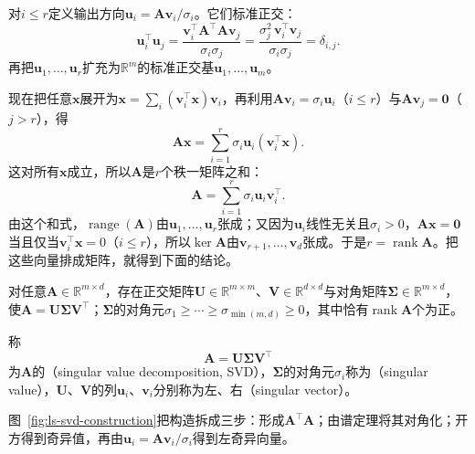 对$i\leq r$定义输出方向$\bm u_i=\bm A\bm v_i/\sigma_i$。它们标准正交：
\[
 \bm u_i^\top\bm u_j
 =\frac{\bm v_i^\top\bm A^\top\bm A\bm v_j}{\sigma_i\sigma_j}
 =\frac{\sigma_j^2\,\bm v_i^\top\bm v_j}{\sigma_i\sigma_j}=\delta_{i,j}.
\]
再把$\bm u_1,\dots,\bm u_r$扩充为$\mathbb R^m$的标准正交基$\bm u_1,\ldots,\bm u_m$。

现在把任意$\bm x$展开为$\bm x=\sum_i(\bm v_i^\top\bm x)\bm v_i$，再利用$\bm A\bm v_i=\sigma_i\bm u_i$（$i\leq r$）与$\bm A\bm v_j=\bm0$（$j>r$），得
\[
 \bm A\bm x=\sum_{i=1}^r\sigma_i\bm u_i(\bm v_i^\top\bm x).
\]
这对所有$\bm x$成立，所以$\bm A$是$r$个秩一矩阵之和：
\begin{equation}
 \bm A=\sum_{i=1}^r\sigma_i\bm u_i\bm v_i^\top.
 \label{eq:matrix-analysis-svd-rank-one-sum}
\end{equation}
由这个和式，$\operatorname{range}(\bm A)$由$\bm u_1,\ldots,\bm u_r$张成；又因为$\bm u_i$线性无关且$\sigma_i>0$，$\bm A\bm x=\bm0$当且仅当$\bm v_i^\top\bm x=0$（$i\leq r$），所以$\ker\bm A$由$\bm v_{r+1},\ldots,\bm v_d$张成。于是$r=\operatorname{rank}\bm A$。把这些向量排成矩阵，就得到下面的结论。

\begin{theorem}[SVD的存在]
\label{thm:ls-svd-existence}
对任意$\bm A\in\mathbb R^{m\times d}$，存在正交矩阵$\bm U\in\mathbb R^{m\times m}$、$\bm V\in\mathbb R^{d\times d}$与对角矩阵$\bm\Sigma\in\mathbb R^{m\times d}$，使$\bm A=\bm U\bm\Sigma\bm V^\top$；$\bm\Sigma$的对角元$\sigma_1\geq\cdots\geq\sigma_{\min(m,d)}\geq0$，其中恰有$\operatorname{rank}\bm A$个为正。
\end{theorem}

\begin{definition}[奇异值分解]
\label{def:matrix-analysis-svd}
称
\begin{equation}
 \bm A=\bm U\bm\Sigma\bm V^\top
 \label{eq:matrix-analysis-svd}
\end{equation}
为$\bm A$的（singular value decomposition, SVD），$\bm\Sigma$的对角元$\sigma_i$称为（singular value），$\bm U$、$\bm V$的列$\bm u_i$、$\bm v_i$分别称为左、右（singular vector）。
\end{definition}

图~\ref{fig:ls-svd-construction}把构造拆成三步：形成$\bm A^\top\bm A$；由谱定理将其对角化；开方得到奇异值，再由$\bm u_i=\bm A\bm v_i/\sigma_i$得到左奇异向量。

